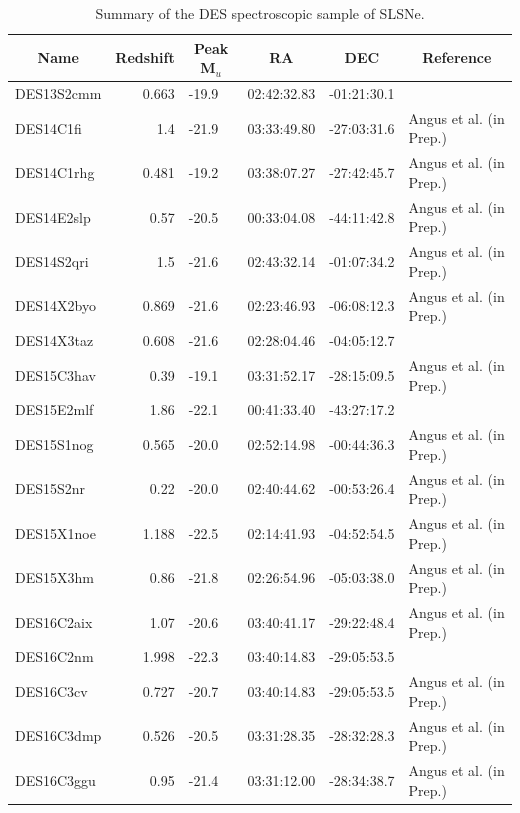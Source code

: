 \begin{table}
\begin{center}
    \caption{Summary of the DES spectroscopic sample of SLSNe.}
    \label{tab:desSLSN}
\begin{tabular}{|l|r|l|l|l|l|}
\hline
    \multicolumn{1}{|c|}{Name} &
    \multicolumn{1}{c|}{Redshift} &
    \multicolumn{1}{c|}{Peak M$_u$} &
    \multicolumn{1}{c|}{RA} &
    \multicolumn{1}{c|}{DEC} &
    \multicolumn{1}{c|}{Reference} \\

\hline
    DES13S2cmm  &   0.663  &    -19.9  &    02:42:32.83    &    -01:21:30.1 & \citet{Papadopoulos2015}\\
\hline
    DES14C1fi   &   1.4    &    -21.9  &    03:33:49.80    &    -27:03:31.6 & Angus et al. (in Prep.)\\
    DES14C1rhg  &   0.481  &    -19.2  &    03:38:07.27    &    -27:42:45.7 & Angus et al. (in Prep.)\\
    DES14E2slp  &   0.57   &    -20.5  &    00:33:04.08    &    -44:11:42.8 & Angus et al. (in Prep.)\\
    DES14S2qri  &   1.5    &    -21.6  &    02:43:32.14    &    -01:07:34.2 & Angus et al. (in Prep.)\\
    DES14X2byo  &   0.869  &    -21.6  &    02:23:46.93    &    -06:08:12.3 & Angus et al. (in Prep.)\\
    DES14X3taz  &   0.608  &    -21.6  &    02:28:04.46    &    -04:05:12.7 & \citet{Smith2016}\\
\hline
    DES15C3hav  &   0.39   &    -19.1  &    03:31:52.17    &    -28:15:09.5 & Angus et al. (in Prep.)\\
    DES15E2mlf  &   1.86   &    -22.1  &    00:41:33.40    &    -43:27:17.2 &  \citet{Pan2017}\\
    DES15S1nog  &   0.565  &    -20.0  &    02:52:14.98    &    -00:44:36.3 & Angus et al. (in Prep.)\\
    DES15S2nr   &   0.22   &    -20.0  &    02:40:44.62    &    -00:53:26.4 & Angus et al. (in Prep.)\\
    DES15X1noe  &   1.188  &    -22.5  &    02:14:41.93    &    -04:52:54.5 & Angus et al. (in Prep.)\\
    DES15X3hm   &   0.86   &    -21.8  &    02:26:54.96    &    -05:03:38.0 & Angus et al. (in Prep.)\\
\hline
    DES16C2aix  &   1.07   &    -20.6  &    03:40:41.17    &    -29:22:48.4 & Angus et al. (in Prep.)\\
    DES16C2nm   &   1.998  &    -22.3  &    03:40:14.83    &    -29:05:53.5 & \citet{Smith2018}\\
    DES16C3cv   &   0.727  &    -20.7  &    03:40:14.83    &    -29:05:53.5 & Angus et al. (in Prep.)\\
    DES16C3dmp  &   0.526  &    -20.5  &    03:31:28.35    &    -28:32:28.3 & Angus et al. (in Prep.)\\
    DES16C3ggu  &   0.95   &    -21.4  &    03:31:12.00    &    -28:34:38.7 & Angus et al. (in Prep.)\\
\hline
\end{tabular}
\end{center}
\end{table}


